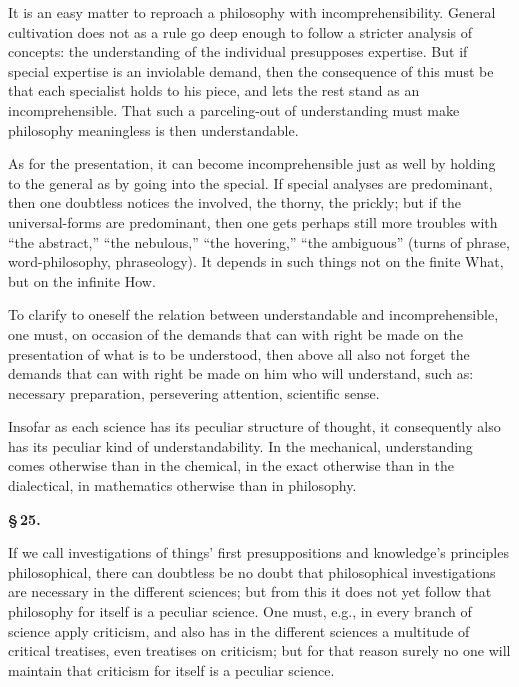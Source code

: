 \documentclass[12pt]{book}
\begin{document}
It is an easy matter to reproach a philosophy with incomprehensibility. General cultivation does not
as a rule go deep enough to follow a stricter analysis of concepts: the understanding of the
individual presupposes expertise. But if special expertise is an inviolable demand, then the
consequence of this must be that each specialist holds to his piece, and lets the rest stand as an
incomprehensible. That such a parceling-out of understanding must make philosophy meaningless is then
understandable.

As for the presentation, it can become incomprehensible just as well by holding to the general as by
going into the special. If special analyses are predominant, then one doubtless notices the involved,
the thorny, the prickly; but if the universal-forms are predominant, then one gets perhaps still more
troubles with ``the abstract,'' ``the nebulous,'' ``the hovering,'' ``the ambiguous'' (turns of
phrase, word-philosophy, phraseology). It depends in such things not on the finite What, but on the
infinite How.

To clarify to oneself the relation between understandable and incomprehensible, one must, on occasion
of the demands that can with right be made on the presentation of what is to be understood, then above
all also not forget the demands that can with right be made on him who will understand, such as:
necessary preparation, persevering attention, scientific sense.

Insofar as each science has its peculiar structure of thought, it consequently also has its peculiar
kind of understandability. In the mechanical, understanding comes otherwise than
in the chemical, in the exact otherwise than in the dialectical, in mathematics otherwise than in
philosophy.

\begin{center}{\bfseries \S\,25.}\end{center}

If we call investigations of things' first presuppositions and knowledge's principles philosophical,
there can doubtless be no doubt that philosophical investigations are necessary in the different
sciences; but from this it does not yet follow that philosophy for itself is a peculiar science. One
must, e.g., in every branch of science apply criticism, and also has in the different sciences a
multitude of critical treatises, even treatises on criticism; but for that reason surely no one will
maintain that criticism for itself is a peculiar science.
\end{document}
